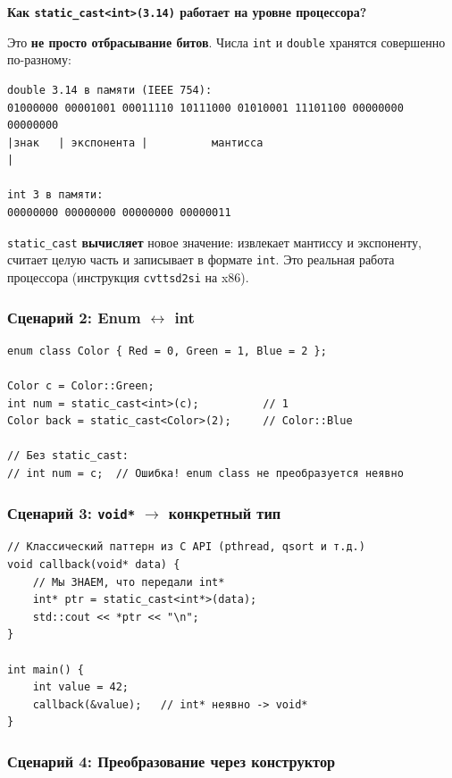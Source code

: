 \documentclass[a4paper,12pt]{article}
\begin{document}
\textbf{Как \texttt{static\_cast<int>(3.14)} работает на уровне процессора?}

Это \textbf{не просто отбрасывание битов}. Числа \texttt{int} и \texttt{double}
хранятся совершенно по-разному:

\begin{lstlisting}[numbers=none]
double 3.14 в памяти (IEEE 754):
01000000 00001001 00011110 10111000 01010001 11101100 00000000 00000000
|знак   | экспонента |          мантисса                              |

int 3 в памяти:
00000000 00000000 00000000 00000011
\end{lstlisting}

\texttt{static\_cast} \textbf{вычисляет} новое значение: извлекает мантиссу
и экспоненту, считает целую часть и записывает в формате \texttt{int}. Это реальная
работа процессора (инструкция \texttt{cvttsd2si} на x86).

\subsubsection{Сценарий 2: Enum $\leftrightarrow$ int}

\begin{lstlisting}
enum class Color { Red = 0, Green = 1, Blue = 2 };

Color c = Color::Green;
int num = static_cast<int>(c);          // 1
Color back = static_cast<Color>(2);     // Color::Blue

// Без static_cast:
// int num = c;  // Ошибка! enum class не преобразуется неявно
\end{lstlisting}

\subsubsection{Сценарий 3: \texttt{void*} $\to$ конкретный тип}

\begin{lstlisting}
// Классический паттерн из C API (pthread, qsort и т.д.)
void callback(void* data) {
    // Мы ЗНАЕМ, что передали int*
    int* ptr = static_cast<int*>(data);
    std::cout << *ptr << "\n";
}

int main() {
    int value = 42;
    callback(&value);   // int* неявно -> void*
}
\end{lstlisting}

\subsubsection{Сценарий 4: Преобразование через конструктор}
\end{document}
